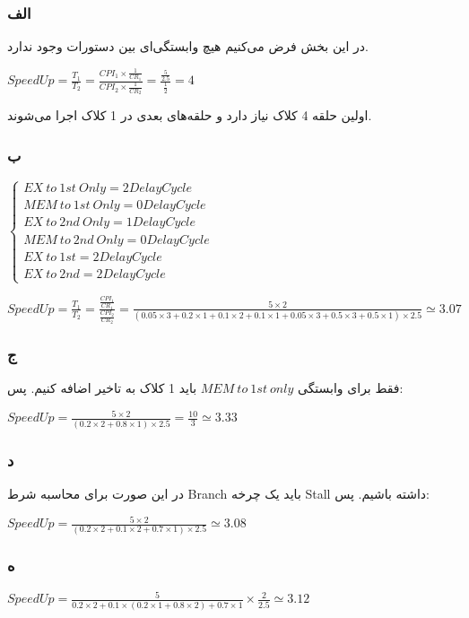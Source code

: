 \subsubsection*{الف}
در این بخش فرض می‌کنیم هیچ وابستگی‌ای بین دستورات وجود ندارد.

\setLTR
$
SpeedUp = \frac{T_1}{T_2} = \frac{CPI_1\times\frac{1}{CR_1}}{CPI_2\times\frac{1}{CR_2}} = \frac{\frac{5}{2.5}}{\frac{1}{2}} = 4
$
\setRTL

اولین حلقه 4 کلاک نیاز دارد و حلقه‌های بعدی در 1 کلاک اجرا می‌شوند.

\subsubsection*{ب}

\setLTR
$
\begin{cases}
	EX \ to \ 1st \ Only = 2 Delay Cycle \\
	MEM \ to \ 1st \ Only = 0 Delay Cycle \\
	EX \ to \ 2nd \ Only = 1 Delay Cycle\\ 
	MEM \ to \ 2nd \ Only = 0 Delay Cycle\\
	EX \ to \ 1st = 2 Delay Cycle\\
	EX \ to \ 2nd =  2 Delay Cycle
	\end{cases}
$

$
SpeedUp = \frac{T_1}{T_2} = \frac{\frac{CPI_1}{CR_1}}{\frac{CPI_2}{CR_2}} = \frac{5\times2}{
(0.05\times3 + 0.2\times1+0.1\times2+0.1\times1+0.05\times3+0.5\times3 + 0.5\times1)\times 2.5
} \simeq 3.07
$
\setRTL


\subsubsection*{ج}

فقط برای وابستگی 
$MEM \ to \ 1st \ only$
باید 1 کلاک به تاخیر اضافه کنیم. پس:

\setLTR
$
SpeedUp = \frac{5\times2}{(0.2\times2 + 0.8\times1)\times2.5} = \frac{10}{3} 
\simeq 3.33
$
\setRTL

\subsubsection*{د}

در این صورت برای محاسبه شرط Branch باید یک چرخه Stall داشته باشیم. پس:

\setLTR
$
SpeedUp = \frac{5\times2}{(0.2\times2 + 0.1\times2+0.7\times1)\times2.5} \simeq 3.08
$
\setRTL

\subsubsection*{ه}

\setLTR
$
SpeedUp = \frac{5}{0.2\times2+0.1\times(0.2\times1+0.8\times2)+0.7\times1} \times \frac{2}{2.5} \simeq 3.12
$
\setRTL



